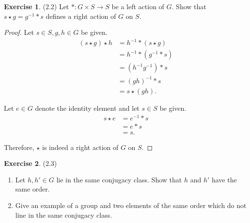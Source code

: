 \documentclass[12pt, psamsfonts]{amsart}
\theoremstyle{definition}
\newtheorem*{exer}{Exercise}
\theoremstyle{remark}
\numberwithin{equation}{section}
\begin{document}
\begin{exer}{(2.2)}
  Let $*: G \times S \rightarrow S$ be a left action of $G$.
  Show that $s \star g = g^{-1} * s$ defines a right action of $G$ on $S$.
\end{exer}

\begin{proof}
  Let $s \in S, g, h \in G$ be given.
  \begin{align*}
    (s \star g) \star h
      &= h^{-1} * (s \star g) \\
      &= h^{-1} * (g^{-1} * s) \\
      &= (h^{-1}g^{-1}) * s \\
      &= (gh)^{-1} * s \\
      &= s \star (gh).
  \end{align*}

  Let $e \in G$ denote the identity element and let $s \in S$ be given.
  \begin{align*}
    s \star e
      &= e^{-1} * s \\
      &= e * s \\
      &= s.
  \end{align*}

  Therefore, $\star$ is indeed a right action of $G$ on $S$.
\end{proof}

\begin{exer}{(2.3)}
$ $
 \begin{enumerate}
   \item
     Let $h, h' \in G$ lie in the same conjugacy class.
     Show that $h$ and $h'$ have the same order.
   \item
    Give an example of a group and two elements of the same order which do not line in the same conjugacy class.
 \end{enumerate}
\end{exer}
\end{document}

